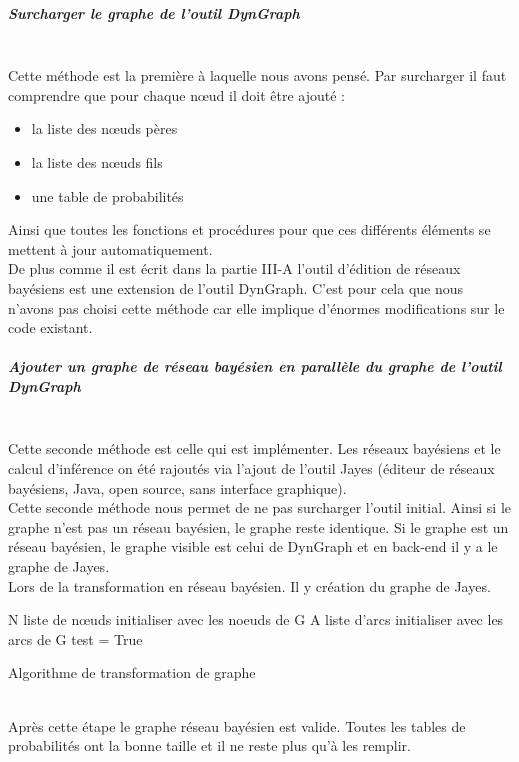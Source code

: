 \documentclass[conference]{IEEEtran}
\begin{document}
\subparagraph{Surcharger le graphe de l'outil DynGraph  \hfill } \\
Cette méthode est la première à laquelle nous avons pensé. Par surcharger il faut comprendre que pour chaque nœud il doit être ajouté : 
\begin{itemize}
\item la liste des nœuds pères 
\item la liste des nœuds fils
\item une table de probabilités 
\end{itemize}
Ainsi que toutes les fonctions et procédures pour que ces différents éléments se mettent à jour automatiquement. \\
De plus comme il est écrit dans la partie III-A l'outil d'édition de réseaux bayésiens est une extension de l'outil DynGraph. C'est pour cela que nous n'avons pas choisi cette méthode car elle implique d'énormes modifications sur le code existant. \\

\subparagraph{Ajouter un graphe de réseau bayésien en parallèle du graphe de l'outil DynGraph \hfill }
\\ Cette seconde méthode est celle qui est implémenter. Les réseaux bayésiens et le calcul d'inférence on été rajoutés via l'ajout de l'outil Jayes (éditeur de réseaux bayésiens, Java, open source, sans interface graphique). \\
Cette seconde méthode nous permet de ne pas surcharger l'outil initial. Ainsi si le graphe n'est pas un réseau bayésien, le graphe reste identique. Si le graphe est un réseau bayésien, le graphe visible est celui de DynGraph et en back-end il y a le graphe de Jayes.\\
Lors de la transformation en réseau bayésien. Il y création du graphe de Jayes. 

 \begin{algorithm}[H]
 N liste de nœuds initialiser avec les noeuds de G\;
 A liste d'arcs initialiser avec les arcs de G\;
 test = True\;
 \EndFor
 \EndFor 
\caption{Algorithme de transformation de graphe}
\end{algorithm}
\\
Après cette étape le graphe réseau bayésien est valide. Toutes les tables de probabilités ont la bonne taille et il ne reste plus qu'à les remplir.
\end{document}
